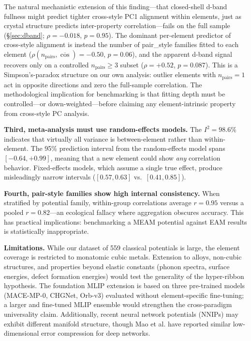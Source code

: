 \documentclass[twocolumn,9pt]{extarticle}
\begin{document}
The natural mechanistic extension of this finding---that closed-shell d-band fullness might predict tighter cross-style PC1 alignment within elements, just as crystal structure predicts inter-property correlation---fails on the full sample (\S\ref{sec:dband}; $\rho = -0.018$, $p = 0.95$). The dominant per-element predictor of cross-style alignment is instead the number of pair\_style families fitted to each element ($\rho(n_{\text{pairs}}, \overline{\cos}) = -0.50$, $p = 0.06$), and the apparent d-band signal recovers only on a controlled $n_{\text{pairs}} \geq 3$ subset ($\rho = +0.52$, $p = 0.087$). This is a Simpson's-paradox structure on our own analysis: outlier elements with $n_{\text{pairs}} = 1$ act in opposite directions and zero the full-sample correlation. The methodological implication for benchmarking is that fitting depth must be controlled---or down-weighted---before claiming any element-intrinsic property from cross-style PC analysis.

\textbf{Third, meta-analysis must use random-effects models.} The $I^2 = 98.6\%$ indicates that virtually all variance is between-element rather than within-element. The 95\% prediction interval from the random-effects model spans $[-0.64, +0.99]$, meaning that a new element could show \textit{any} correlation behavior. Fixed-effects models, which assume a single true effect, produce misleadingly narrow intervals ($[0.57, 0.63]$ vs.\ $[0.41, 0.85]$).

\textbf{Fourth, pair-style families show high internal consistency.} When stratified by potential family, within-group correlations average $r = 0.95$ versus a pooled $r = 0.82$---an ecological fallacy where aggregation obscures accuracy. This has practical implications: benchmarking a MEAM potential against EAM results is statistically inappropriate.

\textbf{Limitations.} While our dataset of 559 classical potentials is large, the element coverage is restricted to monatomic cubic metals. Extension to alloys, non-cubic structures, and properties beyond elastic constants (phonon spectra, surface energies, defect formation energies) would test the generality of the hyper-ribbon hypothesis. The foundation MLIP extension is based on three pre-trained models (MACE-MP-0, CHGNet, Orb-v3) evaluated without element-specific fine-tuning; a larger and fine-tuned MLIP ensemble would strengthen the cross-paradigm universality claim. Additionally, recent neural network potentials (NNIPs) may exhibit different manifold structure, though Mao et al.\cite{mao2024,mao2026} have reported similar low-dimensional error compression for deep networks.
\end{document}
